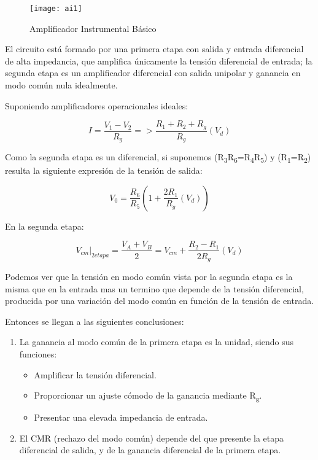 \begin{figure}[h]
  \centering
  \texttt{[image: ai1]}
  \caption{Amplificador Instrumental Básico}\label{fig:aibasico}
\end{figure}

El circuito está formado por una primera etapa con salida y entrada diferencial de alta impedancia, que amplifica únicamente la tensión diferencial de entrada; la segunda etapa es un amplificador diferencial con salida unipolar y ganancia en modo común nula idealmente.

Suponiendo amplificadores operacionales ideales: 

\begin{equation}\label{eq1}
I = \frac{V_1 - V_2}{R_g}  => \frac{R_1+R_2+R_g}{R_g} (V_d)
\end{equation}

Como la segunda etapa es un diferencial, si suponemos (R\textsubscript{3}R\textsubscript{6}=R\textsubscript{4}R\textsubscript{5}) y  (R\textsubscript{1}=R\textsubscript{2}) resulta la siguiente expresión de la tensión de salida:

\begin{equation}\label{eq2}
V_0 = \frac{R_6}{R_5}(1 +\frac{2R_1}{R_g} (V_d))
\end{equation}

En la segunda etapa:

\begin{equation}\label{eq3}
V_{cm}|_{2etapa} = \frac{V_A + V_B}{2}=V_{cm} +\frac{R_2 - R_1}{2R_g}(V_d)
\end{equation}

Podemos ver que la tensión en modo común vista por la segunda etapa es la misma que en la entrada mas un termino que depende de la tensión diferencial, producida por una variación del modo común en función de la tensión de entrada.

Entonces se llegan a las siguientes conclusiones:
\begin{enumerate}
\item La ganancia al modo común de la primera etapa es la unidad, siendo sus funciones:
\begin{itemize}
\item Amplificar la tensión diferencial.
\item Proporcionar un ajuste cómodo de la ganancia mediante R\textsubscript{g}.
\item Presentar una elevada impedancia de entrada.
\end{itemize}
\item El CMR (rechazo del modo común) depende del que presente la etapa diferencial de salida, y de la ganancia diferencial de la primera etapa.
\end{enumerate}

